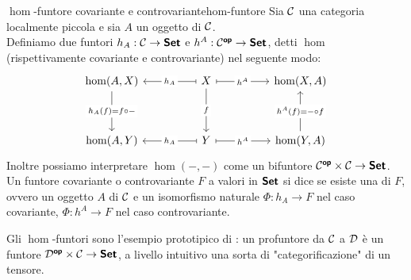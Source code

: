 \documentclass[openany]{book}
\renewcommand\C{\mc{C}}
\newcommand\D{\mc{D}}
\begin{document}
\begin{definition}{$\hom$-funtore covariante e controvariante}{hom-funtore}
    Sia $\C$ una categoria localmente piccola e sia $A$ un oggetto di $\C$.\\
    Definiamo due funtori $h_A:\C\to\setcat$ e $h^A : \C^\op\to\setcat$, detti $\hom$ (rispettivamente covariante e controvariante) nel seguente modo:
    \[\begin{tikzcd}
    	{\hom(A,X)} && X && {\hom(X,A)} \\
    	\\
    	{\hom(A,Y)} && Y && {\hom(Y,A)}
    	\arrow["{h_A(f) = f\circ -}"{description}, from=1-1, to=3-1]
    	\arrow["{h_A}"{description}, maps to, from=1-3, to=1-1]
    	\arrow["{h^A}"{description}, maps to, from=1-3, to=1-5]
    	\arrow["f"{description}, from=1-3, to=3-3]
    	\arrow["{h_A}"{description}, maps to, from=3-3, to=3-1]
    	\arrow["{h^A}"{description}, maps to, from=3-3, to=3-5]
	    \arrow["{h^A(f) = -\circ f}"{description}, from=3-5, to=1-5]
    \end{tikzcd}\]
    Inoltre possiamo interpretare $\hom(-,-)$ come un bifuntore $\C^\op\times \C \to \setcat$.\\
    Un funtore covariante o controvariante $F$ a valori in $\text{\sffamily\textbf{Set}}$ si dice  se esiste una  di $F$, ovvero un oggetto $A$ di $\C$ e un isomorfismo naturale $\Phi:h_A\to F$ nel caso covariante, $\Phi: h^A\to F$ nel caso controvariante.
\end{definition}

Gli $\hom$-funtori sono l'esempio prototipico di : un profuntore da $\C$ a $\D$ è un funtore $\D^\op\times\C\to\setcat$, a livello intuitivo una sorta di "categorificazione" di un tensore.
\end{document}
